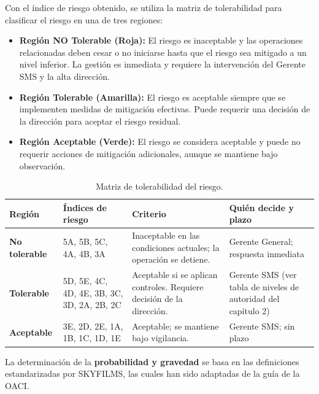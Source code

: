 Con el índice de riesgo obtenido, se utiliza la matriz de tolerabilidad para clasificar el riesgo en una de tres regiones:

\begin{itemize}
    \item \textbf{Región NO Tolerable (Roja):} El riesgo es inaceptable y las operaciones relacionadas deben cesar o no iniciarse hasta que el riesgo sea mitigado a un nivel inferior. La gestión es inmediata y requiere la intervención del Gerente SMS y la alta dirección.
    \item \textbf{Región Tolerable (Amarilla):} El riesgo es aceptable siempre que se implementen medidas de mitigación efectivas. Puede requerir una decisión de la dirección para aceptar el riesgo residual.
    \item \textbf{Región Aceptable (Verde):} El riesgo se considera aceptable y puede no requerir acciones de mitigación adicionales, aunque se mantiene bajo observación.
\end{itemize}

\begin{table}[H]
\centering
\renewcommand{\arraystretch}{1.4}
\begin{tabularx}{\textwidth}{|>{\centering\arraybackslash}p{2.6cm}|>{\centering\arraybackslash}p{3.4cm}|>{\RaggedRight\arraybackslash}X|>{\RaggedRight\arraybackslash}p{3.2cm}|}
\hline
\rowcolor[gray]{0.9}\textbf{Región} & \textbf{Índices de riesgo} & \textbf{Criterio} & \textbf{Quién decide y plazo} \\ \hline
\cellcolor[HTML]{FF4B4B}\textbf{No tolerable} & 5A, 5B, 5C, 4A, 4B, 3A & Inaceptable en las condiciones actuales; la operación se detiene. & Gerente General; respuesta inmediata \\ \hline
\cellcolor[HTML]{FFE04D}\textbf{Tolerable} & 5D, 5E, 4C, 4D, 4E, 3B, 3C, 3D, 2A, 2B, 2C & Aceptable si se aplican controles. Requiere decisión de la dirección. & Gerente SMS (ver tabla de niveles de autoridad del capítulo 2) \\ \hline
\cellcolor[HTML]{3DBE6B}\textbf{Aceptable} & 3E, 2D, 2E, 1A, 1B, 1C, 1D, 1E & Aceptable; se mantiene bajo vigilancia. & Gerente SMS; sin plazo \\ \hline
\end{tabularx}
\caption{Matriz de tolerabilidad del riesgo.}
\end{table}


La determinación de la \textbf{probabilidad y gravedad} se basa en las definiciones estandarizadas por SKYFILMS, las cuales han sido adaptadas de la guía de la OACI.

